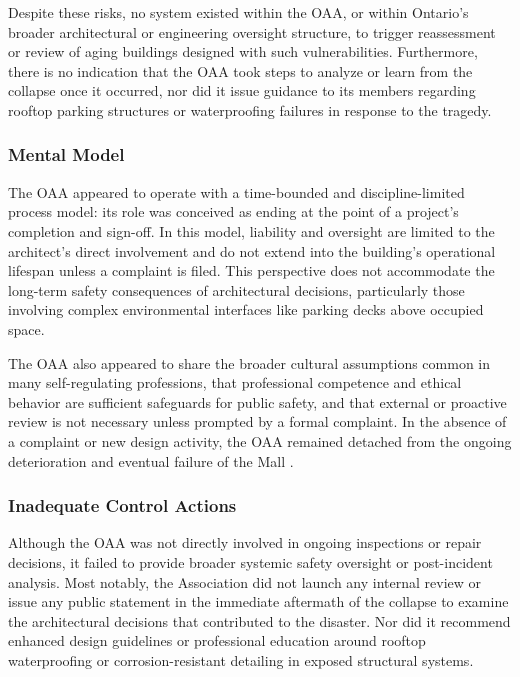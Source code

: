 \documentclass[12pt]{article}
\begin{document}
Despite these risks, no system existed within the OAA, or within Ontario's broader architectural or engineering oversight structure, to trigger reassessment or review of aging buildings designed with such vulnerabilities. Furthermore, there is no indication that the OAA took steps to analyze or learn from the collapse once it occurred, nor did it issue guidance to its members regarding rooftop parking structures or waterproofing failures in response to the tragedy.

\subsubsection*{Mental Model}

The OAA appeared to operate with a time-bounded and discipline-limited process model: its role was conceived as ending at the point of a project's completion and sign-off. In this model, liability and oversight are limited to the architect's direct involvement and do not extend into the building's operational lifespan unless a complaint is filed. This perspective does not accommodate the long-term safety consequences of architectural decisions, particularly those involving complex environmental interfaces like parking decks above occupied space.

The OAA also appeared to share the broader cultural assumptions common in many self-regulating professions, that professional competence and ethical behavior are sufficient safeguards for public safety, and that external or proactive review is not necessary unless prompted by a formal complaint. In the absence of a complaint or new design activity, the OAA remained detached from the ongoing deterioration and eventual failure of the Mall \cite[p398]{AlgoLakeReport1}.

\subsubsection*{Inadequate Control Actions}

Although the OAA was not directly involved in ongoing inspections or repair decisions, it failed to provide broader systemic safety oversight or post-incident analysis. Most notably, the Association did not launch any internal review or issue any public statement in the immediate aftermath of the collapse to examine the architectural decisions that contributed to the disaster. Nor did it recommend enhanced design guidelines or professional education around rooftop waterproofing or corrosion-resistant detailing in exposed structural systems.
\end{document}
